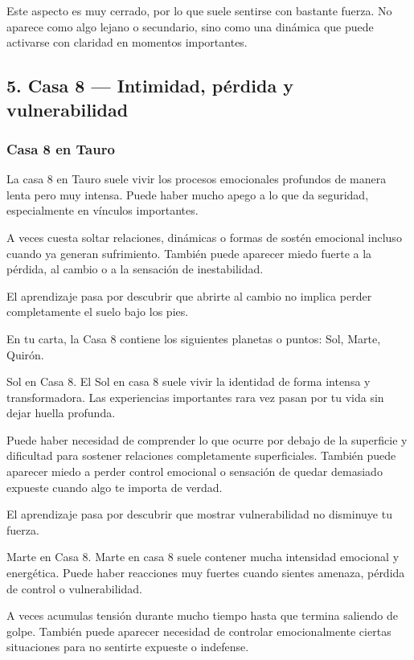 \documentclass[11pt,a4paper]{article}
\begin{document}
Este aspecto es muy cerrado, por lo que suele sentirse con bastante fuerza. No aparece como algo lejano o secundario, sino como una dinámica que puede activarse con claridad en momentos importantes.

\vspace{0.4cm}

\subsection{5. Casa 8 — Intimidad, pérdida y vulnerabilidad}

\subsubsection*{Casa 8 en Tauro}

La casa 8 en Tauro suele vivir los procesos emocionales profundos de manera lenta pero muy intensa. Puede haber mucho apego a lo que da seguridad, especialmente en vínculos importantes.

A veces cuesta soltar relaciones, dinámicas o formas de sostén emocional incluso cuando ya generan sufrimiento. También puede aparecer miedo fuerte a la pérdida, al cambio o a la sensación de inestabilidad.

El aprendizaje pasa por descubrir que abrirte al cambio no implica perder completamente el suelo bajo los pies.

En tu carta, la Casa 8 contiene los siguientes planetas o puntos: Sol, Marte, Quirón.

Sol en Casa 8.
El Sol en casa 8 suele vivir la identidad de forma intensa y transformadora. Las experiencias importantes rara vez pasan por tu vida sin dejar huella profunda.

Puede haber necesidad de comprender lo que ocurre por debajo de la superficie y dificultad para sostener relaciones completamente superficiales. También puede aparecer miedo a perder control emocional o sensación de quedar demasiado expueste cuando algo te importa de verdad.

El aprendizaje pasa por descubrir que mostrar vulnerabilidad no disminuye tu fuerza.

Marte en Casa 8.
Marte en casa 8 suele contener mucha intensidad emocional y energética. Puede haber reacciones muy fuertes cuando sientes amenaza, pérdida de control o vulnerabilidad.

A veces acumulas tensión durante mucho tiempo hasta que termina saliendo de golpe. También puede aparecer necesidad de controlar emocionalmente ciertas situaciones para no sentirte expueste o indefense.
\end{document}
